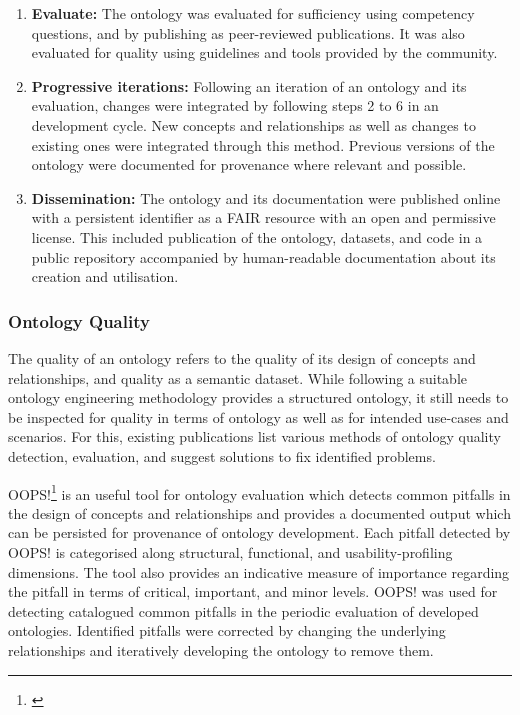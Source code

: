 \begin{enumerate}
    \item \textbf{Evaluate:} The ontology was evaluated for sufficiency using competency questions, and by publishing as peer-reviewed publications. It was also evaluated for quality using guidelines and tools provided by the community.
    \item \textbf{Progressive iterations:} Following an iteration of an ontology and its evaluation, changes were integrated by following steps 2 to 6 in an development cycle. New concepts and relationships as well as changes to existing ones were integrated through this method. Previous versions of the ontology were documented for provenance where relevant and possible.
    \item \textbf{Dissemination:} The ontology and its documentation were published online with a persistent identifier as a FAIR resource with an open and permissive license. This included publication of the ontology, datasets, and code in a public repository accompanied by human-readable documentation about its creation and utilisation.
\end{enumerate}

\subsubsection*{Ontology Quality}
The quality of an ontology refers to the quality of its design of concepts and relationships, and quality as a semantic dataset. While following a suitable ontology engineering methodology provides a structured ontology, it still needs to be inspected for quality in terms of ontology as well as for intended use-cases and scenarios. For this, existing publications \cite{jeremy quality paper, vredicic thesis} list various methods of ontology quality detection, evaluation, and suggest solutions to fix identified problems.

OOPS!\footnote{\url{}} \cite{} is an useful tool for ontology evaluation which detects common pitfalls in the design of concepts and relationships and provides a documented output which can be persisted for provenance of ontology development. Each pitfall detected by OOPS! is categorised along  structural, functional, and usability-profiling dimensions. The tool also provides an indicative measure of importance regarding the pitfall in terms of critical, important, and minor levels.
OOPS! was used for detecting catalogued common pitfalls in the periodic evaluation of developed ontologies. Identified pitfalls were corrected by changing the underlying relationships and iteratively developing the ontology to remove them. 

